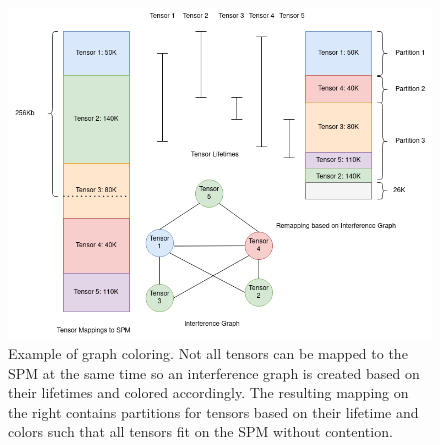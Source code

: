 \begin{figure}[thb!]
\centering
\includegraphics[scale=0.5]{Figures/graph_coloring_example.png}
\decoRule
\caption[graphColoring]{Example of graph coloring. Not all tensors can be
mapped to the SPM at the same time so an interference graph is created
based on their lifetimes and colored accordingly. The resulting mapping on the 
right contains partitions for tensors based on their lifetime and colors such that
all tensors fit on the SPM without contention.}
\label{fig:graph_color}
\end{figure}











